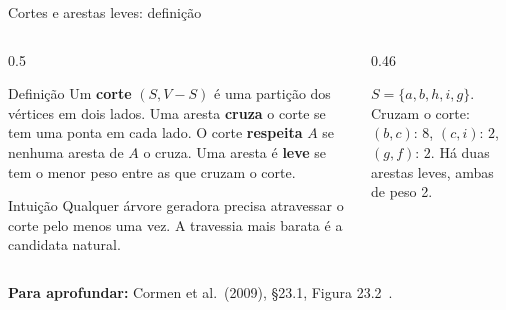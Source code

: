 \documentclass[aspectratio=169,xcolor=table]{beamer}
\newcommand{\arestasclrs}{a/b/4, a/h/8, b/c/8, b/h/11, c/d/7, c/f/4, c/i/2,
  d/e/9, d/f/14, e/f/10, f/g/2, g/h/1, g/i/6, h/i/7}
\newcommand{\grafoclrs}[3]{%
  \coordinate (a) at (0,0);     \coordinate (b) at (1,1);
  \coordinate (c) at (2.3,1);   \coordinate (d) at (3.6,1);
  \coordinate (e) at (4.6,0);   \coordinate (f) at (3.6,-1);
  \coordinate (g) at (2.3,-1);  \coordinate (h) at (1,-1);
  \coordinate (i) at (1.75,0);
  \foreach \u/\v/\w in \arestasclrs \draw[aresta] (\u) -- (\v);
  \def\lista{#1}\ifx\lista\empty\else
    \foreach \u/\v in {#1} \draw[arvore] (\u) -- (\v);\fi
  \def\lista{#3}\ifx\lista\empty\else
    \foreach \u/\v in {#3} \draw[rejeitada] (\u) -- (\v);\fi
  \foreach \u/\v/\w in \arestasclrs \path (\u) -- (\v) node[peso, pos=0.5] {\w};
  \foreach \v in {a,...,i} \node[vert] at (\v) {\v};
  \def\lista{#2}\ifx\lista\empty\else
    \foreach \v in {#2} \node[vdentro] at (\v) {\v};\fi
}
\newcommand{\fonte}[1]{%
  \vfill
  {\tiny\color{gray!55!black}\textbf{Para aprofundar:} #1\par}%
}
\begin{document}
\begin{frame}{Cortes e arestas leves: definição}
  \begin{columns}[c]
    \begin{column}{0.5\textwidth}
      \begin{block}{Definição}
        \scriptsize Um \textbf{corte} $(S, V - S)$ é uma partição dos vértices em dois lados.
        Uma aresta \textbf{cruza} o corte se tem uma ponta em cada lado. O corte
        \textbf{respeita} $A$ se nenhuma aresta de $A$ o cruza. Uma aresta é \textbf{leve}
        se tem o menor peso entre as que cruzam o corte.
      \end{block}
      \begin{exampleblock}{Intuição}
        \scriptsize Qualquer árvore geradora precisa atravessar o corte pelo menos uma vez.
        A travessia mais barata é a candidata natural.
      \end{exampleblock}
    \end{column}
    \begin{column}{0.46\textwidth}
      \begin{center}
      \end{center}
      \scriptsize
      $S = \{a, b, h, i, g\}$. Cruzam o corte: $(b,c){:}\,8$, $(c,i){:}\,2$, $(g,f){:}\,2$.
      Há duas arestas leves, ambas de peso 2.
    \end{column}
  \end{columns}
  \fonte{Cormen et al.\ (2009), \S 23.1, Figura 23.2~\cite{cormen2009introduction}.}
\end{frame}
\end{document}
